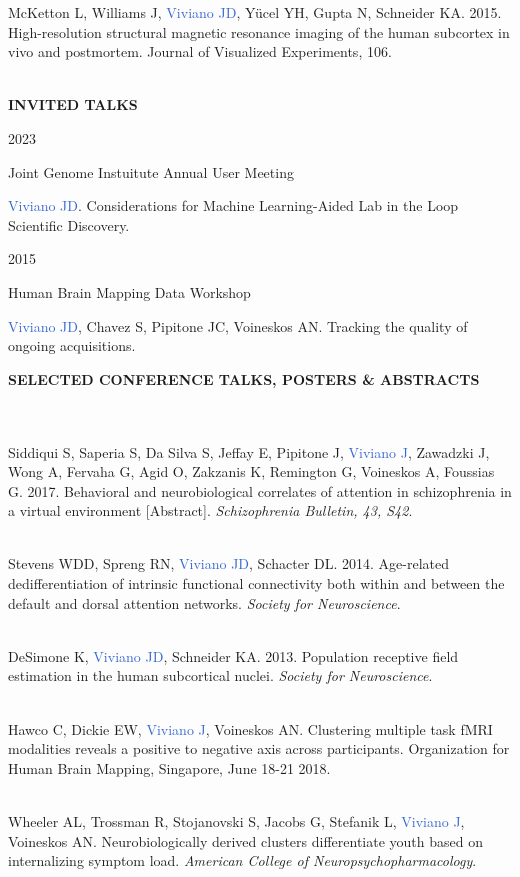 \documentclass[a4paper,11pt,oneside]{book}
\newcommand{\entry}[4]{%
  \parbox[t]{2.5cm}{#1\hfill}\hspace{0cm}\parbox[t]{11.15cm}{%
    \textbf{#2}%
    \hfill%
    {\footnotesize\addfontfeature{Color=lightgray} #3}\
    \vspace{1.5mm}
    \begin{itemize}[leftmargin=-1.5cm]#4\end{itemize}\vspace{\parsep}%
  }}
\newcommand\sectionheading[1]{
    \normalsize
    \noindent
    \leftskip=0in
    \textbf{#1\\
    \vspace{4.5mm}}
}
\begin{document}
\begin{flushleft}
McKetton L, Williams J, \textcolor{highlight}{Viviano JD}, Yücel YH, Gupta N, Schneider KA. 2015. High-resolution structural magnetic resonance imaging of the human subcortex in vivo and postmortem. Journal of Visualized Experiments, 106. \\\

\sectionheading{INVITED TALKS}
\entry
{2023}
{}
{Joint Genome Instuitute Annual User Meeting}
{\textcolor{highlight}{Viviano JD}. Considerations for Machine Learning-Aided Lab in the Loop Scientific Discovery.}

\entry
{2015}
{}
{Human Brain Mapping Data Workshop}
{\textcolor{highlight}{Viviano JD}, Chavez S, Pipitone JC, Voineskos AN. Tracking the quality of ongoing acquisitions.}

\sectionheading{SELECTED CONFERENCE TALKS, POSTERS \& ABSTRACTS} \\\

Siddiqui S, Saperia S, Da Silva S, Jeffay E, Pipitone J, \textcolor{highlight}{Viviano J}, Zawadzki J, Wong A, Fervaha G, Agid O, Zakzanis K, Remington G, Voineskos A, Foussias G. 2017. Behavioral and neurobiological correlates of attention in schizophrenia in a virtual environment [Abstract]. \textit{Schizophrenia Bulletin, 43, S42}. \\\

Stevens WDD, Spreng RN, \textcolor{highlight}{Viviano JD}, Schacter DL. 2014. Age-related dedifferentiation of intrinsic functional connectivity both within and between the default and dorsal attention networks. \textit{Society for Neuroscience}. \\\

DeSimone K, \textcolor{highlight}{Viviano JD}, Schneider KA. 2013. Population receptive field estimation in the human subcortical nuclei. \textit{Society for Neuroscience}. \\\

Hawco C, Dickie EW, \textcolor{highlight}{Viviano J}, Voineskos AN. Clustering multiple task fMRI modalities reveals a positive to negative axis across participants. Organization for Human Brain Mapping, Singapore, June 18-21 2018. \\\

Wheeler AL, Trossman R, Stojanovski S, Jacobs G, Stefanik L, \textcolor{highlight}{Viviano J}, Voineskos AN. Neurobiologically derived clusters differentiate youth based on internalizing symptom load. \textit{American College of Neuropsychopharmacology}. \\\


\end{flushleft}
\end{document}

